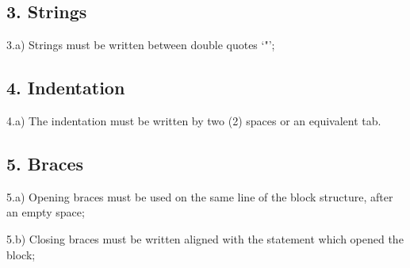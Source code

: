 \documentclass[12pt,openright,a4paper,conference,onecolumn,twoside,english,french,spanish]{IEEEtran}
\begin{document}
\subsection{3. Strings}\label{strings}

3.a) Strings must be written between double quotes `"';

\begin{Shaded}
\begin{Highlighting}[]
 \NormalTok{;}
\end{Highlighting}
\end{Shaded}

\subsection{4. Indentation}\label{indentation}

4.a) The indentation must be written by two (2) spaces or an equivalent
tab.

\begin{Shaded}
\begin{Highlighting}[]
 

\NormalTok{--} \NormalTok{;}

\NormalTok{--}
\NormalTok{--} 
\NormalTok{--\} } \NormalTok{\{}
\NormalTok{--\}}

\NormalTok{--} 
\NormalTok{\}}
\end{Highlighting}
\end{Shaded}

\subsection{5. Braces}\label{braces}

5.a) Opening braces must be used on the same line of the block
structure, after an empty space;

5.b) Closing braces must be written aligned with the statement which
opened the block;
\end{document}
